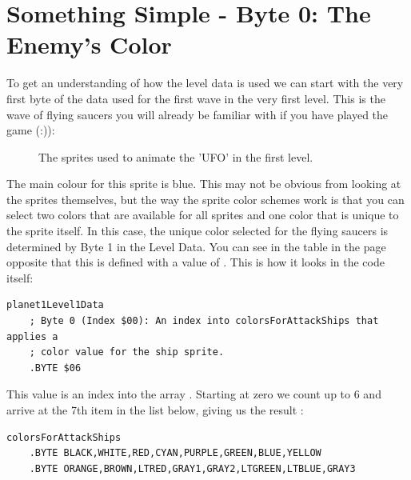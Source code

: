 \section{Something Simple - Byte 0: The Enemy's Color}
To get an understanding of how the level data is used we can start with the very first byte of the data
used for the first wave in the very first level. This is the wave of flying saucers you will already be
familiar with if you have played the game (:)):
\begin{figure}[H]
  {
    \setlength{\tabcolsep}{3.0pt}
    \setlength\cmidrulewidth{\heavyrulewidth} %
	\centering
	\def\MULTICOLORONE{white}
	\def\MULTICOLORTWO{red}
	\def\SPRITECOLOR{blue}
	\begin{subfigure}{0.3\textwidth}
		
	\end{subfigure}
	\begin{subfigure}{0.3\textwidth}
		
	\end{subfigure}
	\begin{subfigure}{0.3\textwidth}
		
	\end{subfigure}
  }\caption[position=top]{The sprites used to animate the 'UFO' in the first level.}
\end{figure}

The main colour for this sprite is blue. This may not be obvious from looking at the sprites themselves, but
the way the sprite color schemes work is that you can select two colors that are available for all sprites and
one color that is unique to the sprite itself. In this case, the unique color selected for the flying saucers is
determined by Byte 1 in the Level Data. You can see in the table in the page opposite
that this is defined with a value of . This is how it looks in the code itself:

\begin{lstlisting}
planet1Level1Data
    ; Byte 0 (Index $00): An index into colorsForAttackShips that applies a
    ; color value for the ship sprite.
    .BYTE $06
\end{lstlisting}

This value is an index into the array . Starting at zero we count up to 6
and arrive at the 7th item in the list below, giving us the result :
\begin{lstlisting}
colorsForAttackShips
    .BYTE BLACK,WHITE,RED,CYAN,PURPLE,GREEN,BLUE,YELLOW
    .BYTE ORANGE,BROWN,LTRED,GRAY1,GRAY2,LTGREEN,LTBLUE,GRAY3
\end{lstlisting}

